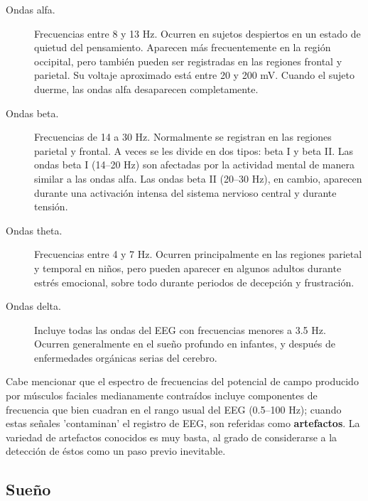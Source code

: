 \documentclass[12pt,a4paper]{mitthesis}
\begin{document}
\begin{description}
\item[Ondas alfa.] Frecuencias entre 8 y 13 Hz. Ocurren en sujetos despiertos en un estado de 
quietud del pensamiento. Aparecen m\'as frecuentemente en la regi\'on occipital, pero tambi\'en 
pueden ser registradas en las regiones frontal y parietal. Su voltaje aproximado est\'a entre 20 y 
200 mV. Cuando el sujeto duerme, las ondas alfa desaparecen completamente. 

\item[Ondas beta.] Frecuencias de 14 a 30 Hz. Normalmente se registran en las regiones parietal y 
frontal. A veces se les divide en dos tipos: beta I y beta II. Las ondas beta I (14--20 Hz) son 
afectadas por la actividad mental de manera similar a las ondas alfa.
Las ondas beta II (20--30 Hz), en cambio, aparecen durante una activaci\'on intensa del sistema 
nervioso central y durante tensi\'on.

\item[Ondas theta.] Frecuencias entre 4 y 7 Hz. Ocurren principalmente en las regiones parietal y 
temporal en ni\~nos, pero pueden aparecer en algunos adultos durante estr\'es emocional, sobre 
todo durante periodos de decepci\'on y frustraci\'on.

\item[Ondas delta.] Incluye todas las ondas del EEG con frecuencias menores a 3.5 Hz. Ocurren 
generalmente en el sue\~no profundo en infantes, y despu\'es de enfermedades org\'anicas serias del 
cerebro.
\end{description}

Cabe mencionar que el espectro de frecuencias del potencial de campo producido por m\'usculos 
faciales medianamente contra\'idos incluye componentes de frecuencia que bien cuadran en el rango 
usual del EEG (0.5--100 Hz); cuando estas se\~nales 'contaminan' el registro de EEG, son referidas
como \textbf{artefactos}. La variedad de artefactos conocidos es muy basta, al grado de
considerarse a la detecci\'on de \'estos como un paso previo inevitable.


\subsection{Sue\~no}
\end{document}
